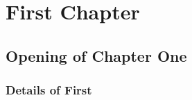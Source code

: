 \documentclass[../main.tex]{subfiles}
\begin{document}
\chapter{First Chapter}
\section{Opening of Chapter One}
\subsection{Details of First}
\end{document}
